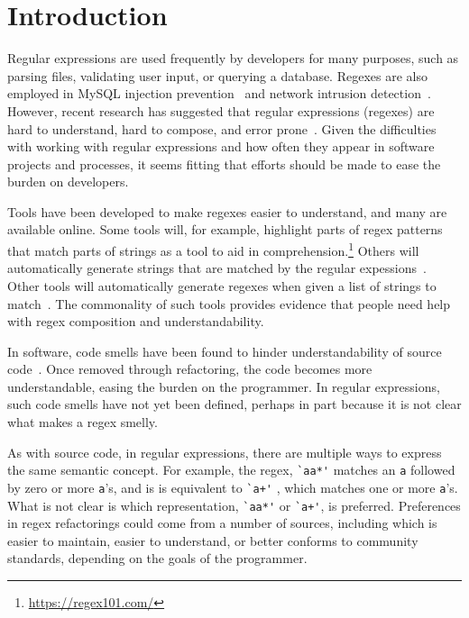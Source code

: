 \section{Introduction }

Regular expressions are used frequently by developers for many purposes, such as parsing files, validating user input, or querying a database.
Regexes are also employed in MySQL injection prevention~\cite{Yeole:2011:ADT:1980022.1980229} and network intrusion detection~\cite{network}. 
However, recent research has suggested that regular expressions (regexes) are hard to understand, hard to compose, and error prone~\cite{Spishak:2012:TSR:2318202.2318207}.
Given the difficulties with working with regular expressions and how often they appear in software projects and processes, it seems fitting that efforts should be made to ease the burden on developers.

Tools have been developed to make regexes easier to understand, and many are available online.
Some tools will, for example, highlight parts of regex patterns that match parts of strings as a tool to aid in comprehension.\footnote{\url{https://regex101.com/}}
Others will automatically generate strings that are matched by the regular expessions~\cite{hampi}.
Other tools will automatically generate regexes when given a list of strings to match~\cite{Babbar:2010:CBA:1871840.1871848, Li:2008:REL:1613715.1613719}.
The commonality of such tools provides evidence that people need help with regex composition and understandability.

In software, code smells have been found to hinder understandability of source code~\cite{abbes2011empirical, du2006does}.
Once removed through refactoring, the code becomes more understandable, easing the burden on the programmer.
In regular expressions, such code smells have not yet been defined, perhaps in part because it is not clear what makes a regex smelly.

As with source code, in regular expressions, there are multiple ways to express the same semantic concept.
For example, the regex, \verb!`aa*'! matches an \verb!a! followed by zero or more \verb!a!'s, and is is equivalent to \verb!`a+'! , which matches one or more \verb!a!'s.
What is not clear is which representation,  \verb!`aa*'!  or  \verb!`a+'!, is preferred.
Preferences in regex refactorings could come from a number of sources, including which is easier to maintain, easier to understand, or better conforms to community standards, depending on the goals of the programmer.

